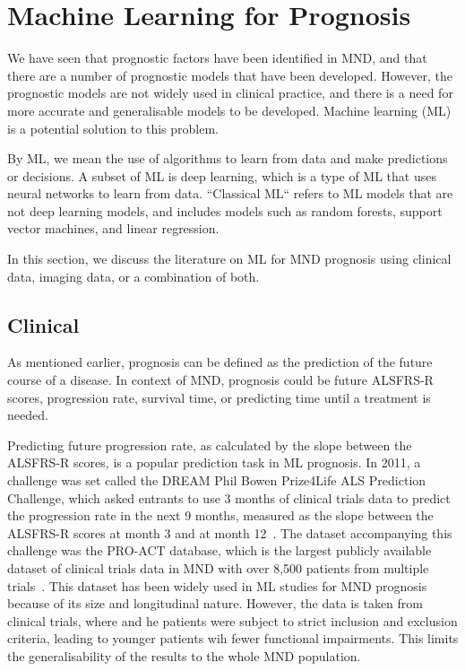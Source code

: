 \section{Machine Learning for Prognosis}

We have seen that prognostic factors have been identified in MND, and that there are a number of prognostic models that have been developed.
However, the prognostic models are not widely used in clinical practice, and there is a need for more accurate and generalisable models to be developed.
Machine learning (ML) is a potential solution to this problem.

By ML, we mean the use of algorithms to learn from data and make predictions or decisions.
A subset of ML is deep learning, which is a type of ML that uses neural networks to learn from data.
``Classical ML`` refers to ML models that are not deep learning models, and includes models such as random forests, support vector machines, and linear regression.

In this section, we discuss the literature on ML for MND prognosis using clinical data, imaging data, or a combination of both.

\subsection{Clinical}


As mentioned earlier, prognosis can be defined as the prediction of the future course of a disease.
In context of MND, prognosis could be future ALSFRS-R scores, progression rate, survival time, or predicting time until a treatment is needed.

Predicting future progression rate, as calculated by the slope between the ALSFRS-R scores, is a popular prediction task in ML prognosis.
In 2011, a challenge was set called the DREAM Phil Bowen Prize4Life ALS Prediction Challenge, which asked entrants to use 3 months of clinical trials data to predict the progression rate in the next 9 months, measured as the slope between the ALSFRS-R scores at month 3 and at month 12~\cite{kuffnerCrowdsourcedAnalysisClinical2015}.
The dataset accompanying this challenge was the PRO-ACT database, which is the largest publicly available dataset of clinical trials data in MND with over 8,500 patients from multiple trials~\cite{atassiPROACTDatabaseDesign2014}.
This dataset has been widely used in ML studies for MND prognosis because of its size and longitudinal nature.
However, the data is taken from clinical trials, where and he patients were subject to strict inclusion and exclusion criteria, leading to younger patients wih fewer functional impairments.
This limits the generalisability of the results to the whole MND population.

